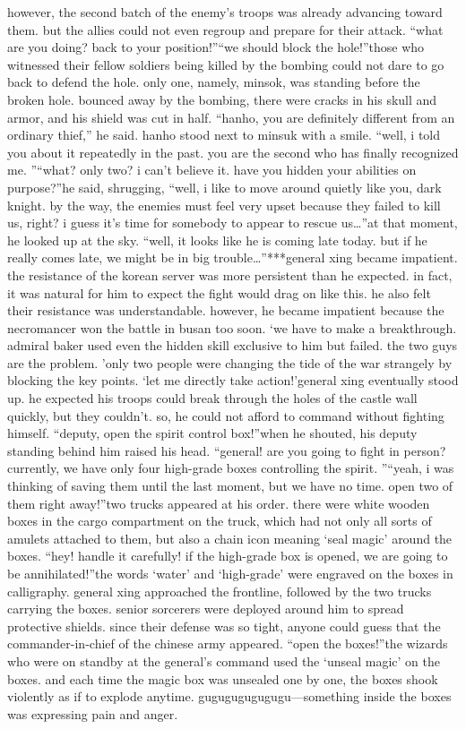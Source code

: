 however, the second batch of the enemy’s troops was already advancing toward them.
 but the allies could not even regroup and prepare for their attack.
“what are you doing? back to your position!”“we should block the hole!”those who witnessed their fellow soldiers being killed by the bombing could not dare to go back to defend the hole.
 only one, namely, minsok, was standing before the broken hole.
bounced away by the bombing, there were cracks in his skull and armor, and his shield was cut in half.
“hanho, you are definitely different from an ordinary thief,” he said.
hanho stood next to minsuk with a smile.
“well, i told you about it repeatedly in the past.
 you are the second who has finally recognized me.
”“what? only two? i can’t believe it.
 have you hidden your abilities on purpose?”he said, shrugging, “well, i like to move around quietly like you, dark knight.
 by the way, the enemies must feel very upset because they failed to kill us, right? i guess it’s time for somebody to appear to rescue us…”at that moment, he looked up at the sky.
“well, it looks like he is coming late today.
 but if he really comes late, we might be in big trouble…”***general xing became impatient.
 the resistance of the korean server was more persistent than he expected.
 in fact, it was natural for him to expect the fight would drag on like this.
 he also felt their resistance was understandable.
 however, he became impatient because the necromancer won the battle in busan too soon.
‘we have to make a breakthrough.
 admiral baker used even the hidden skill exclusive to him but failed.
 the two guys are the problem.
’only two people were changing the tide of the war strangely by blocking the key points.
‘let me directly take action!’general xing eventually stood up.
 he expected his troops could break through the holes of the castle wall quickly, but they couldn’t.
 so, he could not afford to command without fighting himself.
“deputy, open the spirit control box!”when he shouted, his deputy standing behind him raised his head.
“general! are you going to fight in person? currently, we have only four high-grade boxes controlling the spirit.
”“yeah, i was thinking of saving them until the last moment, but we have no time.
 open two of them right away!”two trucks appeared at his order.
 there were white wooden boxes in the cargo compartment on the truck, which had not only all sorts of amulets attached to them, but also a chain icon meaning ‘seal magic’ around the boxes.
“hey! handle it carefully! if the high-grade box is opened, we are going to be annihilated!”the words ‘water’ and ‘high-grade’ were engraved on the boxes in calligraphy.
general xing approached the frontline, followed by the two trucks carrying the boxes.
 senior sorcerers were deployed around him to spread protective shields.
 since their defense was so tight, anyone could guess that the commander-in-chief of the chinese army appeared.
“open the boxes!”the wizards who were on standby at the general’s command used the ‘unseal magic’ on the boxes.
 and each time the magic box was unsealed one by one, the boxes shook violently as if to explode anytime.
gugugugugugugu—something inside the boxes was expressing pain and anger.



